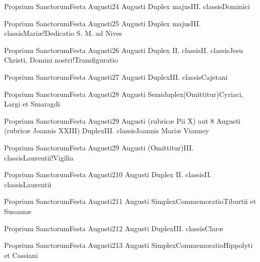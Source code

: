 \documentclass[invitatoriale-romanum.tex]{subfiles}
\begin{document}
	{Proprium Sanctorum}{Festa Augusti}{2}{4 Augusti}
	{Duplex majus}{III. classis}{Dominici}
	{}
	{}

	{Proprium Sanctorum}{Festa Augusti}{2}{5 Augusti}
	{Duplex majus}{III. classis}{Mariæ!Dedicatio S. M. ad Nives}
	{}
	{}

	{Proprium Sanctorum}{Festa Augusti}{2}{6 Augusti}
	{Duplex II. classis}{II. classis}{Jesu Christi, Domini nostri!Transfiguratio}
	{}
	{}

	{Proprium Sanctorum}{Festa Augusti}{2}{7 Augusti}
	{Duplex}{III. classis}{Cajetani}
	{}
	{}

	{Proprium Sanctorum}{Festa Augusti}{2}{8 Augusti}
	{Semiduplex}{(Omittitur)}{Cyriaci, Largi et Smaragdi}
	{}
	{}

	{Proprium Sanctorum}{Festa Augusti}{2}{9 Augusti (rubricæ Pii X) aut 8 Augusti (rubricæ Joannis XXIII)}
	{Duplex}{III. classis}{Joannis Mariæ Vianney}
	{}
	{}

	{Proprium Sanctorum}{Festa Augusti}{2}{9 Augusti}
	{(Omittitur)}{III. classis}{Laurentii!Vigilia}
	{}
	{\invitferia}

\newpage
{}
	{Proprium Sanctorum}{Festa Augusti}{2}{10 Augusti}
	{Duplex II. classis}{II. classis}{Laurentii}
	{}
	{}

	{Proprium Sanctorum}{Festa Augusti}{2}{11 Augusti}
	{Simplex}{Commemoratio}{Tiburtii et Susannæ}
	{}
	{\invitferia}

	{Proprium Sanctorum}{Festa Augusti}{2}{12 Augusti}
	{Duplex}{III. classis}{Claræ}
	{}
	{}

	{Proprium Sanctorum}{Festa Augusti}{2}{13 Augusti}
	{Simplex}{Commemoratio}{Hippolyti et Cassiani}
	{}
	{\invitferia}
\end{document}
